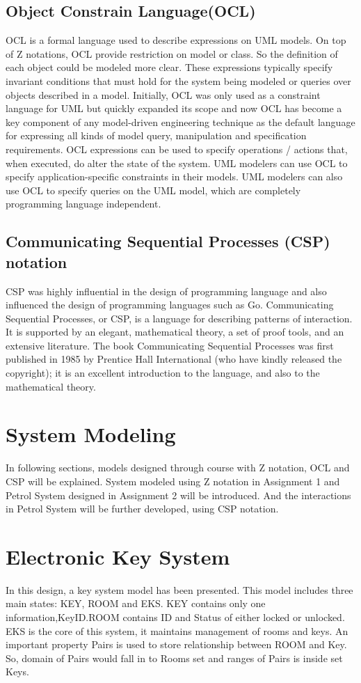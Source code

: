 \subsection{Object Constrain Language(OCL)}
OCL is a formal language used to describe expressions on UML models. On top of Z notations, OCL provide restriction on model or class. So the definition of each object could be modeled more clear. These expressions typically specify invariant conditions that must hold for the system being modeled or queries over objects described in a model.
Initially, OCL was only used as a constraint language for UML but quickly expanded its scope and now OCL has become a key component of any model-driven engineering technique as the default language for expressing all kinds of model query, manipulation and specification requirements. OCL expressions can be used to specify operations / actions that, when executed, do alter the state of the system. UML modelers can use OCL to specify application-specific constraints in their models. UML modelers can also use OCL to specify queries on the UML model, which are completely programming language independent.\cite{OCL}
\subsection{Communicating Sequential Processes (CSP) notation}
CSP was highly influential in the design of programming language and also influenced the design of programming languages such as Go. Communicating Sequential Processes, or CSP, is a language for describing patterns of interaction. It is supported by an elegant, mathematical theory, a set of proof tools, and an extensive literature. The book Communicating Sequential Processes was first published in 1985 by Prentice Hall International (who have kindly released the copyright); it is an excellent introduction to the language, and also to the mathematical theory.\cite{Barnes:2010:CPO:1713254.1713265}
\section{System Modeling}
In following sections, models designed through course with Z notation, OCL and CSP will be explained. System modeled using Z notation in Assignment 1 and Petrol System designed in Assignment 2 will be introduced. And the interactions in Petrol System will be further developed, using CSP notation.
\section{Electronic Key System}
In this design, a key system model has been presented. This model includes three main states: KEY, ROOM and EKS. KEY contains only one information,KeyID.ROOM contains ID and Status of either locked or unlocked. EKS is the core of this system, it maintains management of rooms and keys. An important property Pairs is used to store relationship between ROOM and Key. So, domain of Pairs would fall in to Rooms set and ranges of Pairs is inside set Keys. 

